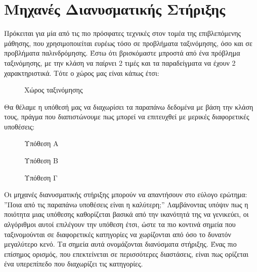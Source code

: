 \chapter{Μηχανές Διανυσματικής Στήριξης}
\label{appendix:Svm}
Πρόκειται για μία από τις πιο πρόσφατες τεχνικές στον τομέα της επιβλεπόμενης μάθησης, που χρησιμοποιείται ευρέως τόσο σε προβλήματα ταξινόμησης, όσο και σε προβλήματα παλινδρόμησης.
Έστω ότι βρισκόμαστε μπροστά από ένα πρόβλημα ταξινόμησης, με την κλάση να παίρνει 2 τιμές και τα παραδείγματα να έχουν 2 χαρακτηριστικά. Τότε ο χώρος μας είναι κάπως έτσι:
\begin{figure}[H]
	\centering			
	\caption[Χώρος ταξινόμησης μηχανής διανυσματικής στήριξης]{Χώρος ταξινόμησης}
\end{figure}
Θα θέλαμε η υπόθεσή μας να διαχωρίσει τα παραπάνω δεδομένα με βάση την κλάση τους, πράγμα που διαπιστώνουμε πως μπορεί να επιτευχθεί με μερικές διαφορετικές υποθέσεις:
\begin{figure}[H]
	\centering
	\begin{minipage}{.333\textwidth}
		\centering
		\caption[Υπόθεση Α μηχανής διανυσματικής στήριξης]{Υπόθεση Α}
		
	\end{minipage}%
	\begin{minipage}{0.333\textwidth}
		\centering
		\caption[Υπόθεση Β μηχανής διανυσματικής στήριξης]{Υπόθεση Β}
		
	\end{minipage}
	\begin{minipage}{0.333\textwidth}
		\centering
		\caption[Υπόθεση Γ μηχανής διανυσματικής στήριξης]{Υπόθεση Γ}
		
	\end{minipage}
\end{figure}
Οι μηχανές διανυσματικής στήριξης μπορούν να απαντήσουν στο εύλογο ερώτημα: ”Ποια από τις παραπάνω υποθέσεις είναι η καλύτερη;” Λαμβάνοντας υπόψιν πως η ποιότητα μιας υπόθεσης καθορίζεται βασικά από την ικανότητά της να γενικεύει, οι αλγόριθμοι αυτοί επιλέγουν την υπόθεση έτσι, ώστε τα πιο κοντινά σημεία που ταξινομούνται σε διαφορετικές κατηγορίες να χωρίζονται από όσο το δυνατόν
μεγαλύτερο κενό. Τα σημεία αυτά ονομάζονται διανύσματα στήριξης. Ένας πιο επίσημος ορισμός, που επεκτείνεται σε περισσότερες διαστάσεις, είναι πως ορίζεται ένα υπερεπίπεδο που διαχωρίζει τις κατηγορίες.

